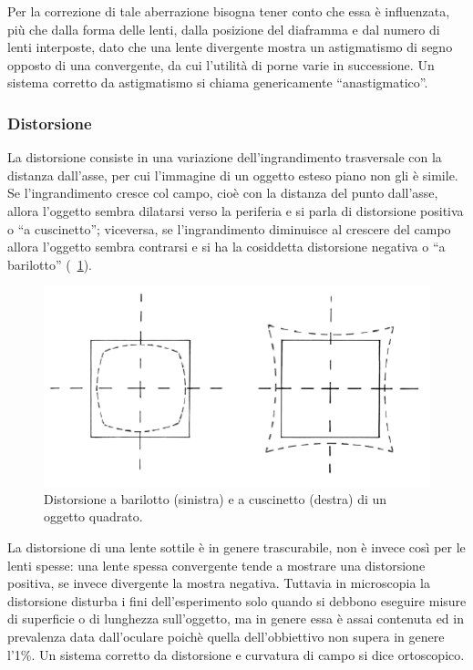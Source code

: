 Per la correzione di tale aberrazione bisogna tener conto che essa è influenzata, più che dalla forma delle lenti, dalla posizione del diaframma e dal numero di lenti interposte, dato che una lente divergente mostra un astigmatismo di segno opposto di una convergente, da cui l'utilità di porne varie in successione. 
Un sistema corretto da astigmatismo si chiama genericamente ``anastigmatico''. 

\subsubsection*{Distorsione}
La distorsione consiste in una variazione dell'ingrandimento trasversale con la distanza dall'asse, per cui l'immagine di un oggetto esteso piano non gli è simile. 
Se l'ingrandimento cresce col campo, cioè con la distanza del punto dall'asse, allora l'oggetto sembra dilatarsi verso la periferia e si parla di distorsione positiva o ``a cuscinetto''; viceversa, se l'ingrandimento diminuisce al crescere del campo allora l'oggetto sembra contrarsi e si ha la cosiddetta distorsione negativa o ``a barilotto'' (\figurename~\ref{fig:distorsione}).

\begin{figure}
 \centering
 \includegraphics[scale=.65]{img/CAP2disto.png}
 \caption{\small{Distorsione a barilotto (sinistra) e a cuscinetto (destra) di un oggetto quadrato.}}
 \label{fig:distorsione}
\end{figure}

La distorsione di una lente sottile è in genere trascurabile, non è invece così per le lenti spesse: una lente spessa convergente tende a mostrare una distorsione positiva, se invece divergente la mostra negativa.
Tuttavia in microscopia la distorsione disturba i fini dell'esperimento solo quando si debbono eseguire misure di superficie o di lunghezza sull'oggetto, ma in genere essa è assai contenuta ed in prevalenza data dall'oculare poichè quella dell'obbiettivo non supera in genere l'1\%.
Un sistema corretto da distorsione e curvatura di campo si dice ortoscopico.


